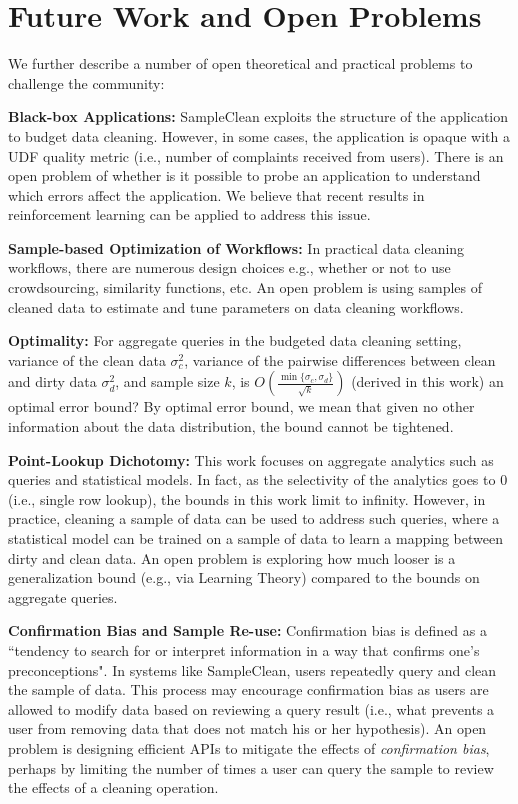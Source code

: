 \section{Future Work and Open Problems}
We further describe a number of open theoretical and practical problems to challenge the community:

\vspace{0.5em}
\noindent \textbf{Black-box Applications: } SampleClean exploits the structure of the application to budget data cleaning. However, in some cases, the application is opaque with a UDF quality metric (i.e., number of complaints received from users). There is an open problem of whether is it possible to probe an application to understand which errors affect the application. We believe that recent results in reinforcement learning can be applied to address this issue.

\vspace{0.5em}
\noindent \textbf{Sample-based Optimization of Workflows: } In practical data cleaning workflows, there are numerous design choices e.g., whether or not to use crowdsourcing, similarity functions, etc. An open problem is using samples of cleaned data to estimate and tune parameters on data cleaning workflows.

\vspace{0.5em}
\noindent \textbf{Optimality: }For aggregate queries in the budgeted data cleaning setting,
variance of the clean data $\sigma_c^2$, variance of the pairwise differences between clean and dirty data $\sigma_d^2$, and sample size $k$, is $O(\frac{\min \{\sigma_c,\sigma_d\}}{\sqrt{k}})$ (derived in this work) an optimal error bound? By optimal error bound, we mean that given no other information about the data distribution, the bound cannot be tightened.

\vspace{0.5em}
\noindent \textbf{Point-Lookup Dichotomy: } This work focuses on aggregate analytics such as queries and statistical models. In fact, as the selectivity of the analytics goes to 0 (i.e., single row lookup), the bounds in this work limit to infinity. However, in practice, cleaning a sample of data can be used to address such queries, where a statistical model can be trained on a sample of data to learn a mapping between dirty and clean data. An open problem is exploring how much looser is a generalization bound (e.g., via Learning Theory) compared to the bounds on aggregate queries.

\vspace{0.5em}
\noindent \textbf{Confirmation Bias and Sample Re-use: } Confirmation bias is defined as a ``tendency to search for or interpret information in a way that confirms one's preconceptions"\cite{plous1993psychology}. In systems like SampleClean, users repeatedly query and clean the sample of data. This process may encourage confirmation bias as users are allowed to modify data based on reviewing a query result (i.e., what prevents a user from removing data that does not match his or her hypothesis). An open problem is designing efficient APIs to mitigate the effects of \emph{confirmation bias}, perhaps by limiting the number of times a user can query the sample to review the effects of a cleaning operation.


